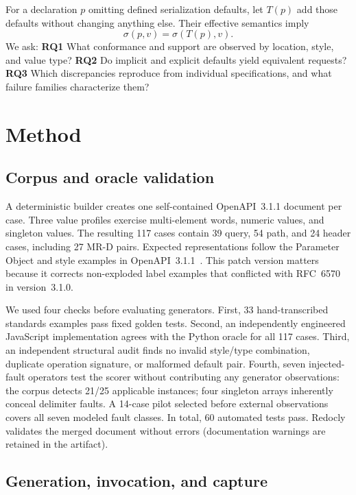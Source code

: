 \documentclass[runningheads]{llncs}
\begin{document}
For a declaration $p$ omitting defined serialization defaults, let $T(p)$ add those defaults without changing anything else. Their effective semantics imply
\begin{equation}
\sigma(p,v)=\sigma(T(p),v). \tag{MR-D}
\end{equation}
We ask: \textbf{RQ1} What conformance and support are observed by location, style, and value type? \textbf{RQ2} Do implicit and explicit defaults yield equivalent requests? \textbf{RQ3} Which discrepancies reproduce from individual specifications, and what failure families characterize them?

\section{Method}

\subsection{Corpus and oracle validation}

A deterministic builder creates one self-contained OpenAPI~3.1.1 document per case. Three value profiles exercise multi-element words, numeric values, and singleton values. The resulting 117 cases contain 39 query, 54 path, and 24 header cases, including 27 MR-D pairs. Expected representations follow the Parameter Object and style examples in OpenAPI~3.1.1~\cite{oas}. This patch version matters because it corrects non-exploded label examples that conflicted with RFC~6570 in version~3.1.0.

We used four checks before evaluating generators. First, 33 hand-transcribed standards examples pass fixed golden tests. Second, an independently engineered JavaScript implementation agrees with the Python oracle for all 117 cases. Third, an independent structural audit finds no invalid style/type combination, duplicate operation signature, or malformed default pair. Fourth, seven injected-fault operators test the scorer without contributing any generator observations: the corpus detects 21/25 applicable instances; four singleton arrays inherently conceal delimiter faults. A 14-case pilot selected before external observations covers all seven modeled fault classes. In total, 60 automated tests pass. Redocly validates the merged document without errors (documentation warnings are retained in the artifact).

\subsection{Generation, invocation, and capture}
\end{document}
